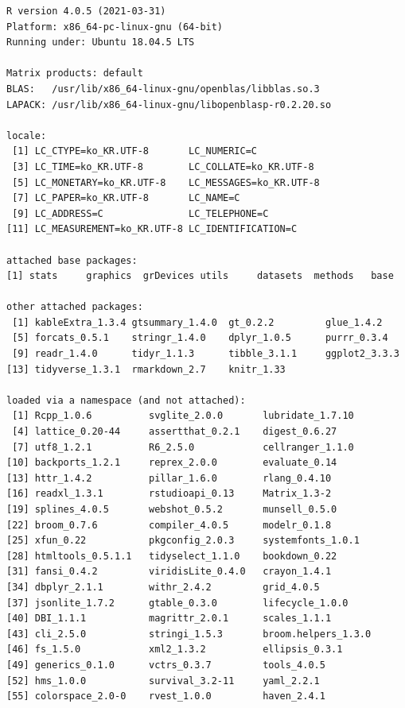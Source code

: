 \documentclass[
  11pt,
]{krantz}
\begin{document}
\begin{verbatim}
R version 4.0.5 (2021-03-31)
Platform: x86_64-pc-linux-gnu (64-bit)
Running under: Ubuntu 18.04.5 LTS

Matrix products: default
BLAS:   /usr/lib/x86_64-linux-gnu/openblas/libblas.so.3
LAPACK: /usr/lib/x86_64-linux-gnu/libopenblasp-r0.2.20.so

locale:
 [1] LC_CTYPE=ko_KR.UTF-8       LC_NUMERIC=C              
 [3] LC_TIME=ko_KR.UTF-8        LC_COLLATE=ko_KR.UTF-8    
 [5] LC_MONETARY=ko_KR.UTF-8    LC_MESSAGES=ko_KR.UTF-8   
 [7] LC_PAPER=ko_KR.UTF-8       LC_NAME=C                 
 [9] LC_ADDRESS=C               LC_TELEPHONE=C            
[11] LC_MEASUREMENT=ko_KR.UTF-8 LC_IDENTIFICATION=C       

attached base packages:
[1] stats     graphics  grDevices utils     datasets  methods   base     

other attached packages:
 [1] kableExtra_1.3.4 gtsummary_1.4.0  gt_0.2.2         glue_1.4.2      
 [5] forcats_0.5.1    stringr_1.4.0    dplyr_1.0.5      purrr_0.3.4     
 [9] readr_1.4.0      tidyr_1.1.3      tibble_3.1.1     ggplot2_3.3.3   
[13] tidyverse_1.3.1  rmarkdown_2.7    knitr_1.33      

loaded via a namespace (and not attached):
 [1] Rcpp_1.0.6          svglite_2.0.0       lubridate_1.7.10   
 [4] lattice_0.20-44     assertthat_0.2.1    digest_0.6.27      
 [7] utf8_1.2.1          R6_2.5.0            cellranger_1.1.0   
[10] backports_1.2.1     reprex_2.0.0        evaluate_0.14      
[13] httr_1.4.2          pillar_1.6.0        rlang_0.4.10       
[16] readxl_1.3.1        rstudioapi_0.13     Matrix_1.3-2       
[19] splines_4.0.5       webshot_0.5.2       munsell_0.5.0      
[22] broom_0.7.6         compiler_4.0.5      modelr_0.1.8       
[25] xfun_0.22           pkgconfig_2.0.3     systemfonts_1.0.1  
[28] htmltools_0.5.1.1   tidyselect_1.1.0    bookdown_0.22      
[31] fansi_0.4.2         viridisLite_0.4.0   crayon_1.4.1       
[34] dbplyr_2.1.1        withr_2.4.2         grid_4.0.5         
[37] jsonlite_1.7.2      gtable_0.3.0        lifecycle_1.0.0    
[40] DBI_1.1.1           magrittr_2.0.1      scales_1.1.1       
[43] cli_2.5.0           stringi_1.5.3       broom.helpers_1.3.0
[46] fs_1.5.0            xml2_1.3.2          ellipsis_0.3.1     
[49] generics_0.1.0      vctrs_0.3.7         tools_4.0.5        
[52] hms_1.0.0           survival_3.2-11     yaml_2.2.1         
[55] colorspace_2.0-0    rvest_1.0.0         haven_2.4.1        
\end{verbatim}
\end{document}

